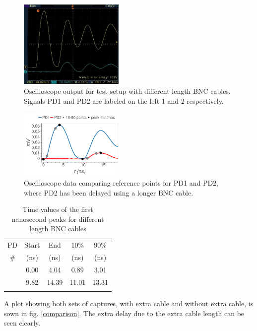 \documentclass[aps,prl,reprint]{revtex4-2}
\begin{document}
\begin{figure}[h]
\includegraphics[width=0.45\textwidth]{./BMPs/l4_C_c.jpg}
\caption{\label{setup2} Oscilloscope output for test setup with different length BNC cables.
Signals PD1 and PD2 are labeled on the left 1 and 2 respectively.}
\end{figure}

\begin{figure}[h]
\includegraphics[width=0.45\textwidth]{../Images/l4_C_a.png}
\caption{\label{diff} Oscilloscope data comparing reference points for PD1 and PD2, where PD2 
has been delayed using a longer BNC cable.}
\end{figure}

\begin{table}[h]
\renewcommand{\arraystretch}{1.35}
\setlength{\tabcolsep}{10pt}
\caption{\label{TD_Cb} Time values of the first nanosecond peaks for different length 
	BNC cables}
\begin{tabular}{|c|c|c|c|c|}
\toprule
PD & Start & End & 10\% & 90\% \\
\# & (ns)& (ns)& (ns)& (ns)\\
\colrule
1 &   0.00 &   4.04 &   0.89 &   3.01 \\
\colrule
2 &   9.82 &  14.39 &  11.01 &  13.31 \\
\hline
\botrule
\end{tabular}
\end{table}







A plot showing both sets of captures, with extra
cable and without extra cable, is sown in fig. \ref{comparison}. The extra delay due to
the extra cable length can be seen clearly.
\end{document}

